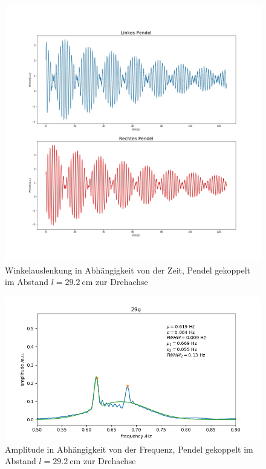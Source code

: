 \begin{figure}[H]
	\centering
	\includegraphics[height = 0.5 \textheight]{figures/211-19.jpeg}
	\caption{Winkelauslenkung in Abhängigkeit von der Zeit, Pendel gekoppelt im Abstand $l = \SI{29,2}{\cm}$ zur Drehachse}
\end{figure}
\begin{figure}[H]
	\centering
	\includegraphics[height = 0.23 \textheight]{figures/211-20.jpeg}
	\caption{Amplitude in Abhängigkeit von der Frequenz, Pendel gekoppelt im Abstand $l = \SI{29,2}{\cm}$ zur Drehachse}
\end{figure}

